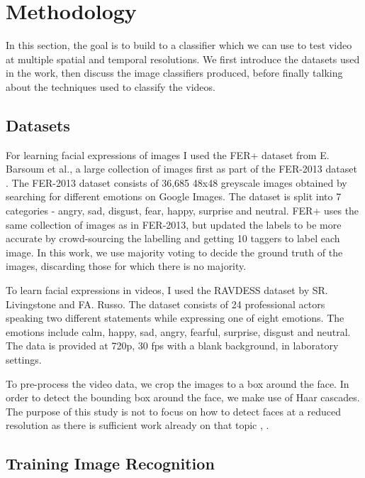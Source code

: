 \documentclass[sigconf]{acmart}
\begin{document}
{\section{Methodology}
In this section, the goal is to build to a classifier which we can use to test
video at multiple spatial and temporal resolutions. We first introduce the
datasets used in the work, then discuss the image classifiers produced, before
finally talking about the techniques used to classify the videos.

\subsection{Datasets}

For learning facial expressions of images I used the FER+ dataset
\cite{barsoum2016training} from E. Barsoum et al., a large collection of
images first as part of the FER-2013 dataset \cite{goodfellow2013challenges}.
The FER-2013 dataset consists of 36,685 48x48 greyscale images obtained
by searching for different emotions on Google Images. The dataset is split
into 7 categories - angry, sad, disgust, fear, happy, surprise and neutral.
FER+ uses the same collection of images as in FER-2013, but updated the labels
to be more accurate by crowd-sourcing the labelling and getting 10 taggers to
label each image. In this work, we use majority voting to decide the ground
truth of the images, discarding those for which there is no majority. 

To learn facial expressions in videos, I used the RAVDESS
\cite{livingstone2018ryerson} dataset by SR. Livingstone and FA. Russo. The
dataset consists of 24 professional actors speaking two different statements
while expressing one of eight emotions. The emotions include calm, happy, sad,
angry, fearful, surprise, disgust and neutral. The data is provided at 720p,
30 fps with a blank background, in laboratory settings.

To pre-process the video data, we crop the images to a box around the face. In
order to detect the bounding box around the face, we make use of Haar
cascades. The purpose of this study is not to focus on how to detect faces at
a reduced resolution as there is sufficient work already on that topic \cite{zheng2010face}, \cite{tian2004evaluation}.




\subsection{Training Image Recognition}

}
\end{document}
